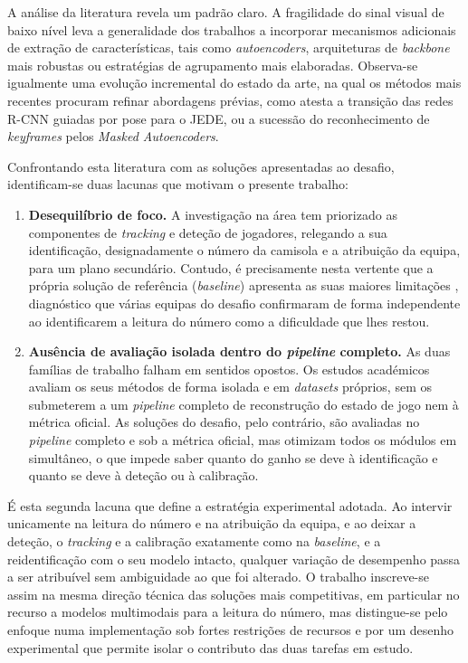 A análise da literatura revela um padrão claro. A fragilidade do sinal visual de baixo nível leva a generalidade dos trabalhos a incorporar mecanismos adicionais de extração de características, tais como \emph{autoencoders}, arquiteturas de \emph{backbone} mais robustas ou estratégias de agrupamento mais elaboradas. Observa-se igualmente uma evolução incremental do estado da arte, na qual os métodos mais recentes procuram refinar abordagens prévias, como atesta a transição das redes R-CNN guiadas por pose para o JEDE, ou a sucessão do reconhecimento de \emph{keyframes} pelos \emph{Masked Autoencoders}.

Confrontando esta literatura com as soluções apresentadas ao desafio, identificam-se duas lacunas que motivam o presente trabalho:

\begin{enumerate}
    \item \textbf{Desequilíbrio de foco.} A investigação na área tem priorizado as componentes de \emph{tracking} e deteção de jogadores, relegando a sua identificação, designadamente o número da camisola e a atribuição da equipa, para um plano secundário. Contudo, é precisamente nesta vertente que a própria solução de referência (\emph{baseline}) apresenta as suas maiores limitações \citep{somers2024soccernet}, diagnóstico que várias equipas do desafio confirmaram de forma independente ao identificarem a leitura do número como a dificuldade que lhes restou.

    \item \textbf{Ausência de avaliação isolada dentro do \emph{pipeline} completo.} As duas famílias de trabalho falham em sentidos opostos. Os estudos académicos avaliam os seus métodos de forma isolada e em \emph{datasets} próprios, sem os submeterem a um \emph{pipeline} completo de reconstrução do estado de jogo nem à métrica oficial. As soluções do desafio, pelo contrário, são avaliadas no \emph{pipeline} completo e sob a métrica oficial, mas otimizam todos os módulos em simultâneo, o que impede saber quanto do ganho se deve à identificação e quanto se deve à deteção ou à calibração.
\end{enumerate}

É esta segunda lacuna que define a estratégia experimental adotada. Ao intervir unicamente na leitura do número e na atribuição da equipa, e ao deixar a deteção, o \emph{tracking} e a calibração exatamente como na \emph{baseline}, e a reidentificação com o seu modelo intacto, qualquer variação de desempenho passa a ser atribuível sem ambiguidade ao que foi alterado. O trabalho inscreve-se assim na mesma direção técnica das soluções mais competitivas, em particular no recurso a modelos multimodais para a leitura do número, mas distingue-se pelo enfoque numa implementação sob fortes restrições de recursos e por um desenho experimental que permite isolar o contributo das duas tarefas em estudo.
